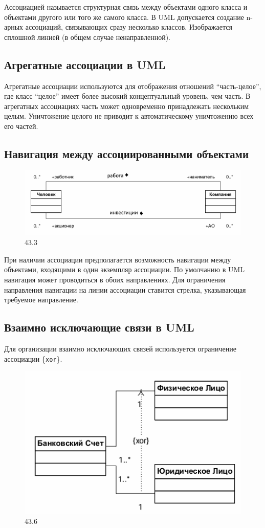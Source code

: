 \documentclass[a4paper,12pt]{article}
\begin{document}
Ассоциацией называется структурная связь между объектами одного класса и объектами другого или того же самого класса. В UML допускается создание n-арных ассоциаций, связывающих сразу несколько классов. Изображается сплошной линией (в общем случае ненаправленной).
\subsection{Агрегатные ассоциации в UML}

Агрегатные ассоциации используются для отображения отношений ``часть-целое'', где класс ``целое'' имеет более высокий концептуальный уровень, чем часть. В агрегатных ассоциациях часть может одновременно принадлежать нескольким целым. Уничтожение целого не приводит к автоматическому уничтожению всех его частей.

\subsection{Навигация между ассоциированными объектами}
\begin{figure}
        \centering
        \includegraphics[width=1\linewidth]{image3.png}
        \caption{43.3}
        \label{fig:enter-label}
    \end{figure}

При наличии ассоциации предполагается возможность навигации между объектами, входящими в один экземпляр ассоциации. По умолчанию в UML навигация может проводиться в обоих направлениях. Для ограничения направления навигации на линии ассоциации ставится стрелка, указывающая требуемое направление.

\subsection{Взаимно исключающие связи в UML}

Для организации взаимно исключающих связей используется ограничение ассоциации \{\texttt{xor}\}.

\begin{center}
    \begin{figure}
        \centering
        \includegraphics[width=0.5\linewidth]{image4.png}
        \caption{43.6 }
        \label{fig:enter-label}
    \end{figure}
\end{center}
\end{document}
